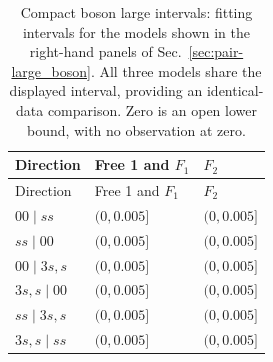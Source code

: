 \begingroup\setlength{\tabcolsep}{2pt}
\begin{longtable}{lll}
\caption{Compact boson large intervals: fitting intervals for the models shown in the right-hand panels of Sec.~\ref{sec:pair-large_boson}. All three models share the displayed interval, providing an identical-data comparison. Zero is an open lower bound, with no observation at zero.}
\label{tab:window-large_boson-ranges}\\\toprule
Direction & Free 1 and $F_1$ & $F_2$\\\midrule
\endfirsthead
\toprule
Direction & Free 1 and $F_1$ & $F_2$\\\midrule
\endhead
\bottomrule\endfoot
$00\mid ss$ & $(0,0.005]$ & $(0,0.005]$\\
$ss\mid 00$ & $(0,0.005]$ & $(0,0.005]$\\
$00\mid 3s,s$ & $(0,0.005]$ & $(0,0.005]$\\
$3s,s\mid 00$ & $(0,0.005]$ & $(0,0.005]$\\
$ss\mid 3s,s$ & $(0,0.005]$ & $(0,0.005]$\\
$3s,s\mid ss$ & $(0,0.005]$ & $(0,0.005]$\\
\end{longtable}
\endgroup

